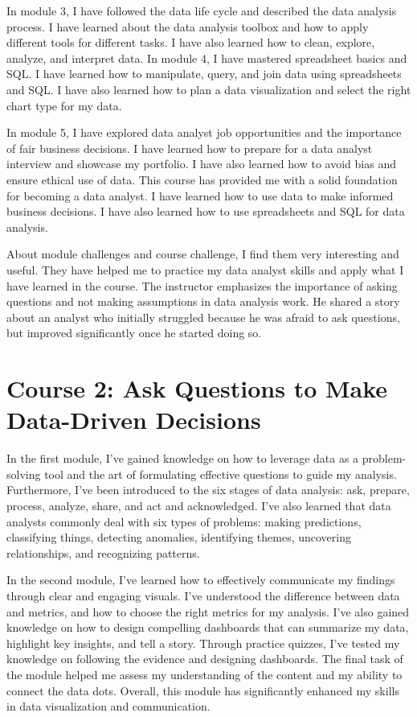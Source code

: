 \documentclass[]{article}
\begin{document}
In module 3, I have followed the data life cycle and described the data analysis process. I have learned about the data analysis toolbox and how to apply different tools for different tasks. I have also learned how to clean, explore, analyze, and interpret data.
In module 4, I have mastered spreadsheet basics and SQL. I have learned how to manipulate, query, and join data using spreadsheets and SQL. I have also learned how to plan a data visualization and select the right chart type for my data.

In module 5, I have explored data analyst job opportunities and the importance of fair business decisions. I have learned how to prepare for a data analyst interview and showcase my portfolio. I have also learned how to avoid bias and ensure ethical use of data. This course has provided me with a solid foundation for becoming a data analyst. I have learned how to use data to make informed business decisions. I have also learned how to use spreadsheets and SQL for data analysis.

About module challenges and course challenge, I find them very interesting and useful. They have helped me to practice my data analyst skills and apply what I have learned in the course. The instructor emphasizes the importance of asking questions and not making assumptions in data analysis work. He shared a story about an analyst who initially struggled because he was afraid to ask questions, but improved significantly once he started doing so.

\section{Course 2: Ask Questions to Make Data-Driven Decisions}
In the first module, I've gained knowledge on how to leverage data as a problem-solving tool and the art of formulating effective questions to guide my analysis. Furthermore, I've been introduced to the six stages of data analysis: ask, prepare, process, analyze, share, and act and acknowledged. I've also learned that data analysts commonly deal with six types of problems: making predictions, classifying things, detecting anomalies, identifying themes, uncovering relationships, and recognizing patterns.

In the second module, I've learned how to effectively communicate my findings through clear and engaging visuals. I've understood the difference between data and metrics, and how to choose the right metrics for my analysis. I've also gained knowledge on how to design compelling dashboards that can summarize my data, highlight key insights, and tell a story. Through practice quizzes, I've tested my knowledge on following the evidence and designing dashboards. The final task of the module helped me assess my understanding of the content and my ability to connect the data dots. Overall, this module has significantly enhanced my skills in data visualization and communication.
\end{document}
